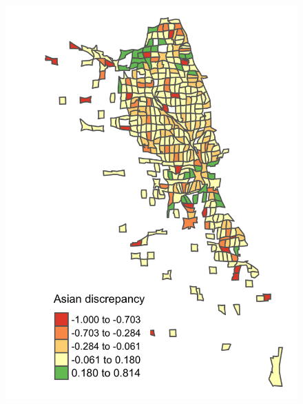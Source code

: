 \begin{figure}[htbp]
\begin{center}
\includegraphics[scale=0.25]{pics/asian-gap.png}

\end{center}
\end{figure}
